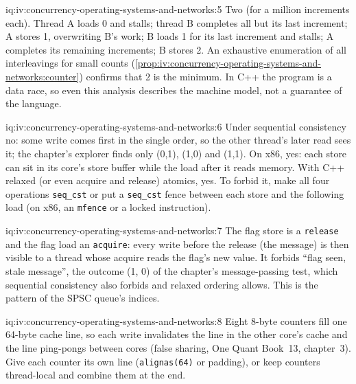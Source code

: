 \begin{solution}{iq:iv:concurrency-operating-systems-and-networks:5}
Two (for a million increments each). Thread A loads 0 and stalls; thread B completes all but its last increment; A stores 1,
overwriting B's work; B loads 1 for its last increment and stalls; A completes its remaining increments; B stores 2. An exhaustive
enumeration of all interleavings for small counts (\cref{prop:iv:concurrency-operating-systems-and-networks:counter}) confirms that
2 is the minimum. In C++ the program is a data race, so even this analysis describes the machine model, not a guarantee of the
language.
\end{solution}

\begin{solution}{iq:iv:concurrency-operating-systems-and-networks:6}
Under sequential consistency no: some write comes first in the single order, so the other thread's later read sees it; the chapter's
explorer finds only (0,1), (1,0) and (1,1). On x86, yes: each store can sit in its core's store buffer while the load after it reads
memory. With C++ relaxed (or even acquire and release) atomics, yes. To forbid it, make all four operations \texttt{seq\_cst} or put a
\texttt{seq\_cst} fence between each store and the following load (on x86, an \texttt{mfence} or a locked instruction).
\end{solution}

\begin{solution}{iq:iv:concurrency-operating-systems-and-networks:7}
The flag store is a \texttt{release} and the flag load an \texttt{acquire}: every write before the release (the message) is then
visible to a thread whose acquire reads the flag's new value. It forbids ``flag seen, stale message'', the outcome (1, 0) of
the chapter's message-passing test, which sequential consistency also forbids and relaxed ordering allows. This is the pattern of
the SPSC queue's indices.
\end{solution}

\begin{solution}{iq:iv:concurrency-operating-systems-and-networks:8}
Eight 8-byte counters fill one 64-byte cache line, so each write invalidates the line in the other core's cache and the line
ping-pongs between cores (false sharing, One Quant Book~13, chapter~3). Give each counter its own line (\texttt{alignas(64)} or padding),
or keep counters thread-local and combine them at the end.
\end{solution}

